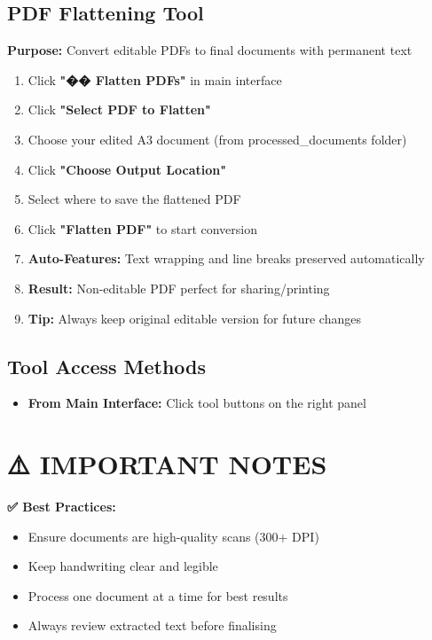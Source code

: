 \documentclass[11pt,a4paper]{article}
\begin{document}
\subsection*{\faFilePdf\space PDF Flattening Tool}
\textbf{Purpose:} Convert editable PDFs to final documents with permanent text
\begin{enumerate}[leftmargin=*,itemsep=0pt]
    \item Click \textcolor{primary}{\textbf{"�� Flatten PDFs"}} in main interface
    \item Click \textcolor{primary}{\textbf{"Select PDF to Flatten"}}
    \item Choose your edited A3 document (from processed\_documents folder)
    \item Click \textcolor{primary}{\textbf{"Choose Output Location"}}
    \item Select where to save the flattened PDF
    \item Click \textcolor{success}{\textbf{"Flatten PDF"}} to start conversion
    \item \textbf{Auto-Features:} Text wrapping and line breaks preserved automatically
    \item \textbf{Result:} Non-editable PDF perfect for sharing/printing
    \item \textbf{Tip:} Always keep original editable version for future changes
\end{enumerate}


\subsection*{\faCogs\space Tool Access Methods}
\begin{itemize}[leftmargin=*,itemsep=0pt]
    \item \textbf{From Main Interface:} Click tool buttons on the right panel
\end{itemize}

\section*{⚠️ IMPORTANT NOTES}

\begin{tcolorbox}[colback=success!10,colframe=success]
\textbf{✅ Best Practices:}
\begin{itemize}[leftmargin=*,itemsep=0pt]
    \item Ensure documents are high-quality scans (300+ DPI)
    \item Keep handwriting clear and legible
    \item Process one document at a time for best results
    \item Always review extracted text before finalising
\end{itemize}
\end{tcolorbox}
\end{document}
